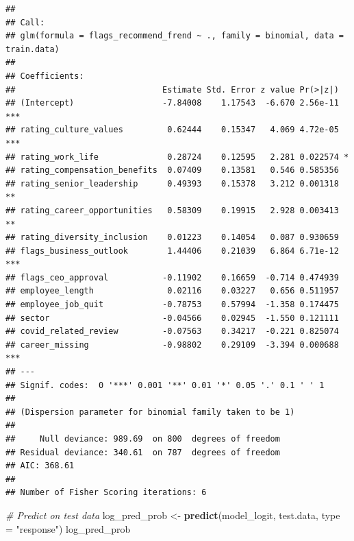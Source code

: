 \documentclass[
]{article}
\newenvironment{Shaded}{\begin{snugshade}}{\end{snugshade}}
\newcommand{\AttributeTok}[1]{\textcolor[rgb]{0.13,0.29,0.53}{#1}}
\newcommand{\CommentTok}[1]{\textcolor[rgb]{0.56,0.35,0.01}{\textit{#1}}}
\newcommand{\FunctionTok}[1]{\textcolor[rgb]{0.13,0.29,0.53}{\textbf{#1}}}
\newcommand{\NormalTok}[1]{#1}
\newcommand{\OtherTok}[1]{\textcolor[rgb]{0.56,0.35,0.01}{#1}}
\newcommand{\StringTok}[1]{\textcolor[rgb]{0.31,0.60,0.02}{#1}}
\begin{document}
\begin{verbatim}
## 
## Call:
## glm(formula = flags_recommend_frend ~ ., family = binomial, data = train.data)
## 
## Coefficients:
##                              Estimate Std. Error z value Pr(>|z|)    
## (Intercept)                  -7.84008    1.17543  -6.670 2.56e-11 ***
## rating_culture_values         0.62444    0.15347   4.069 4.72e-05 ***
## rating_work_life              0.28724    0.12595   2.281 0.022574 *  
## rating_compensation_benefits  0.07409    0.13581   0.546 0.585356    
## rating_senior_leadership      0.49393    0.15378   3.212 0.001318 ** 
## rating_career_opportunities   0.58309    0.19915   2.928 0.003413 ** 
## rating_diversity_inclusion    0.01223    0.14054   0.087 0.930659    
## flags_business_outlook        1.44406    0.21039   6.864 6.71e-12 ***
## flags_ceo_approval           -0.11902    0.16659  -0.714 0.474939    
## employee_length               0.02116    0.03227   0.656 0.511957    
## employee_job_quit            -0.78753    0.57994  -1.358 0.174475    
## sector                       -0.04566    0.02945  -1.550 0.121111    
## covid_related_review         -0.07563    0.34217  -0.221 0.825074    
## career_missing               -0.98802    0.29109  -3.394 0.000688 ***
## ---
## Signif. codes:  0 '***' 0.001 '**' 0.01 '*' 0.05 '.' 0.1 ' ' 1
## 
## (Dispersion parameter for binomial family taken to be 1)
## 
##     Null deviance: 989.69  on 800  degrees of freedom
## Residual deviance: 340.61  on 787  degrees of freedom
## AIC: 368.61
## 
## Number of Fisher Scoring iterations: 6
\end{verbatim}

\begin{Shaded}
\begin{Highlighting}[]
\CommentTok{\# Predict on test data}
\NormalTok{log\_pred\_prob }\OtherTok{\textless{}{-}} \FunctionTok{predict}\NormalTok{(model\_logit, test.data, }\AttributeTok{type =} \StringTok{"response"}\NormalTok{)}
\NormalTok{log\_pred\_prob}
\end{Highlighting}
\end{Shaded}
\end{document}
